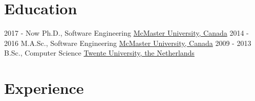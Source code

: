 \documentclass[letterpaper]{twentysecondcv} %
\begin{document}
\makeprofile %



\section{Education}

\begin{twenty} %
  \twentyitem
    {2017 - Now}
    {}
    {Ph.D., Software Engineering}%
    {\href{https://www.mcmaster.ca/}{McMaster University, Canada}}
    {}
    {}
  \twentyitem
    {2014 - 2016}
    {}
    {M.A.Sc., Software Engineering}%
    {\href{https://www.mcmaster.ca/}{McMaster University, Canada}}
    {}
    {}
  \twentyitem
    {2009 - 2013}
    {}
    {B.Sc., Computer Science}%
    {\href{https://www.utwente.nl/}{Twente University, the Netherlands}}
    {}
    {}
\end{twenty}


\section{Experience}
\end{document}

